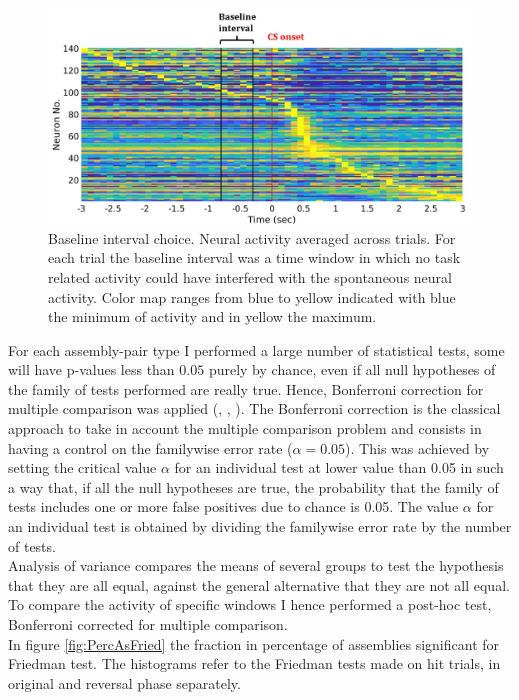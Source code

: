 \begin{figure}[H]
\centering
\includegraphics[scale=0.6]{figures/Baseline.pdf}
\caption{Baseline interval choice. Neural activity averaged across trials. For each trial the baseline interval was a time window in which no task related activity could have interfered with the spontaneous neural activity. Color map ranges from blue to yellow indicated with blue the minimum of activity and in yellow the maximum.}
\label{fig:Baseline}
\end{figure}
For each assembly-pair type I performed a large number of statistical tests, some will have p-values less than $0.05$ purely by chance, even if all null hypotheses of the family of tests performed are really true. Hence, Bonferroni correction for multiple comparison was applied (\cite{Bonferroni}, \cite{Dunn1958}, \cite{Dunn1961}). The Bonferroni correction is the classical approach to take in account the multiple comparison problem and consists in having a control on the familywise error rate ($\alpha=0.05$). This was achieved by setting the critical value $\alpha$ for an individual test at lower value than 0.05 in such a way that, if all the null hypotheses are true, the probability that the family of tests includes one or more false positives due to chance is 0.05. The value $\alpha$ for an individual test is obtained by dividing the familywise error rate by the number of tests.\\Analysis of variance compares the means of several groups to test the hypothesis that they are all equal, against the general alternative that they are not all equal. To compare the activity of specific  windows I hence performed a post-hoc test, Bonferroni corrected for multiple comparison.\\In figure \ref{fig:PercAsFried} the fraction in percentage of assemblies significant for Friedman test. The histograms refer to the Friedman tests made on hit trials, in original and reversal phase separately.
